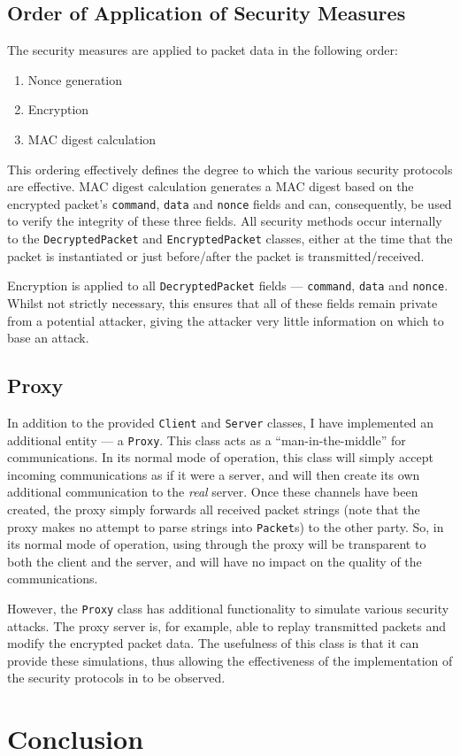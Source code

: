 \documentclass[a4paper,11pt]{article}
\begin{document}
\subsection{Order of Application of Security Measures}
The security measures are applied to packet data in the following order:
\begin{enumerate}
\item Nonce generation
\item Encryption
\item MAC digest calculation
\end{enumerate}

This ordering effectively defines the degree to which the various security 
protocols are effective. MAC digest calculation generates a MAC digest based on
the encrypted packet's \verb+command+, \verb+data+ and \verb+nonce+ fields and 
can, consequently, be used to verify the integrity of these three fields. All 
security methods occur internally to the \verb+DecryptedPacket+ and 
\verb+EncryptedPacket+ classes, either at the time that the packet is 
instantiated or just before/after the packet is transmitted/received.

Encryption is applied to all \verb+DecryptedPacket+ fields --- \verb+command+, 
\verb+data+ and \verb+nonce+. Whilst not strictly necessary, this ensures that 
all of these fields remain private from a potential attacker, giving the 
attacker very little information on which to base an attack. 

\subsection{Proxy}
In addition to the provided \serviceName{} \verb+Client+ and \verb+Server+ 
classes, I have implemented an additional \serviceName{} entity --- a 
\serviceName{} \verb+Proxy+. This class acts as a ``man-in-the-middle'' for
\serviceName{} communications. In its normal mode of operation, this class will
simply accept incoming \serviceName{} communications as if it were a 
\serviceName{} server, and will then create its own additional \serviceName{}
communication to the \emph{real} \serviceName{} server. Once these channels have
been created, the proxy simply forwards all received packet strings (note that 
the proxy makes no attempt to parse strings into \verb+Packet+s) to the other
party. So, in its normal mode of operation, using \serviceName{} through the
proxy will be transparent to both the client and the server, and will have no
impact on the quality of the communications.

However, the \verb+Proxy+ class has additional functionality to simulate 
various security attacks. The proxy server is, for example, able to replay 
transmitted packets and modify the encrypted packet data. The usefulness of this
class is that it can provide these simulations, thus allowing the effectiveness
of the implementation of the security protocols in \serviceName{} to be 
observed.

\section{Conclusion}
\end{document}
